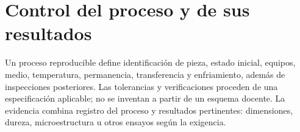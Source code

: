 \section{Control del proceso y de sus resultados}
Un proceso reproducible define identificación de pieza, estado inicial, equipos, medio, temperatura, permanencia, transferencia y enfriamiento, además de inspecciones posteriores. Las tolerancias y verificaciones proceden de una especificación aplicable; no se inventan a partir de un esquema docente. La evidencia combina registro del proceso y resultados pertinentes: dimensiones, dureza, microestructura u otros ensayos según la exigencia.
